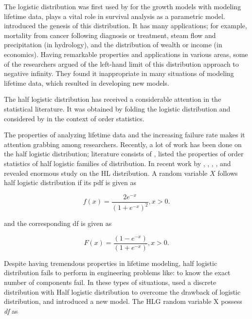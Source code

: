 \documentclass[11pt,a4paper]{article}
\numberwithin{equation}{section}
\begin{document}
	The logistic distribution was first used by \cite{verhulst1838notice,verhulst1845loi} for the growth models with modeling lifetime data, plays a vital role in survival analysis as a parametric model.   \cite{gumbel1944ranges} introduced the genesis of this distribution. It has many applications; for example, mortality from cancer following diagnosis or treatment, steam flow and precipitation (in hydrology), and the distribution of wealth or income (in economics). Having remarkable properties and applications in various areas, some of the researchers argued of the left-hand limit of this distribution approach to negative infinity. They found it inappropriate in many situations of modeling lifetime data, which resulted in developing new models.

	The half logistic distribution has received a considerable attention in the statistical literature. It was obtained by folding the logistic distribution and considered by \cite{balakrishnan1985order} in the context of order statistics. 

	The properties of analyzing lifetime data and the increasing failure rate makes it attention grabbing among researchers. Recently, a lot of  work has been done on the  half logistic distribution; literature consists of \cite{balakrishnan2013recurrence}, \cite{jodra2014logarithmic} listed the properties of order statistics of half logistic families of distribution. In recent work by \cite{alotaibi2020bivariate}, \cite{almarashi2020statistical}, \cite{jeon2020estimation}, \cite{xavier2020study}, and \cite{zhang2020parameter} revealed enormous study on the HL distribution. A random variable $X$ follows half logistic distribution if its pdf is given as

	\begin{equation}

		f(x)=\dfrac{2e^{-x}}{(1+e^{-x})^2}, x>0.

	\end{equation}

	and the corresponding df is given as

	\begin{equation}

		F(x)=\dfrac{(1-e^{-x})}{(1+e^{-x})}, x>0.

	\end{equation}

	Despite having tremendous properties in lifetime modeling, half logistic distribution fails to perform in engineering problems like: to know the exact number of components fail. In these types of situations, \cite{liu2020recurrence}  used a discrete distribution with Half logistic distribution to overcome the drawback of logistic distribution, and introduced a new model. The HLG random variable X possess \textit{df} as
\end{document}
